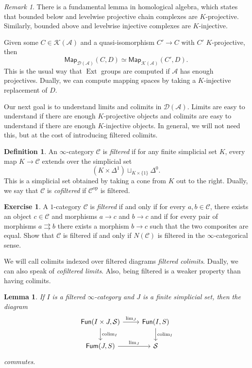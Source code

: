 \documentclass[10pt, oneside]{memoir}
\newtheorem{lem}[thm]{Lemma}
\theoremstyle{definition}
\newtheorem{defn}[thm]{Definition}
\newtheorem{exer}[thm]{Exercise}
\theoremstyle{remark}
\newtheorem{rmk}[thm]{Remark}
\theoremstyle{plain}
\theoremstyle{definition}
\theoremstyle{remark}
\newcommand{\mc}[1]{\mathcal{#1}}
\newcommand{\ms}[1]{\mathsf{#1}}
\newcommand{\1}{\mathbf{1}}
\newcommand{\2}{\mathbf{2}}
\newcommand{\3}{\mathbf{3}}
\DeclareMathOperator{\Ext}{Ext}
\DeclareMathOperator{\op}{op}
\DeclareMathOperator*{\colim}{colim}
\begin{document}
\begin{rmk}
    There is a fundamental lemma in homological algebra, which states that bounded below and levelwise projective chain complexes are \(K \)-projective. Similarly, bounded above and levelwise injective complexes are \(K \)-injective.
\end{rmk}

Given some \(C \in \mc{K}(\mc{A}) \) and a quasi-isomorphism \(C' \to C \) with \(C' \) \(K \)-projective, then
\[ \ms{Map}_{\mc{D}(\mc{A})} (C, D) \simeq \ms{Map}_{\mc{K}(\mc{A})} (C', D). \]
This is the usual way that \(\Ext \) groups are computed if \(\mc{A} \) has enough projectives. Dually, we can compute mapping spaces by taking a \(K \)-injective replacement of \(D \).

Our next goal is to understand limits and colimits in \(\mc{D}(\mc{A}) \). Limits are easy to understand if there are enough \(K \)-projective objects and colimits are easy to understand if there are enough \(K \)-injective objects. In general, we will not need this, but at the cost of introducing filtered colimits.

\begin{defn}
    An \(\infty \)-category \(\mc{C} \) is \textit{filtered} if for any finite simplicial set \(K \), every map \(K \to \mc{C} \) extends over the simplicial set
    \[ (K \times \Delta^1) \sqcup_{K \times \{1\}} \Delta^0. \]
    This is a simplicial set obtained by taking a cone from \(K \) out to the right. Dually, we say that \(\mc{C} \) is \textit{cofiltered} if \(\mc{C}^{\op} \) is filtered.
\end{defn}

\begin{exer}
    A \(1 \)-category \(\mc{C} \) is \textit{filtered} if and only if for every \(a, b \in \mc{C} \), there exists an object \(c \in \mc{C} \) and morphisms \(a \to c \) and \(b\to c \) and if for every pair of morphisms \(a \rightrightarrows b \) there exists a morphism \(b \to c \) such that the two composites are equal. Show that \(\mc{C} \) is filtered if and only if \(N(\mc{C}) \) is filtered in the \(\infty \)-categorical sense.
\end{exer}

We will call colimits indexed over filtered diagrams \textit{filtered colimits}. Dually, we can also speak of \textit{cofiltered limits}. Also, being filtered is a weaker property than having colimits.

\begin{lem}
    If \(I \) is a filtered \(\infty \)-category and \(J \) is a finite simplicial set, then the diagram
    \begin{equation*}
    \begin{tikzcd}
        \ms{Fun}(I \times J, \mc{S}) \ar{d}{\colim_I} \ar{r}{\lim_J} & \ms{Fun}(I, S) \ar{d}{\colim_I} \\
        \ms{Fum}(J, S) \ar{r}{\lim_J} & \mc{S}
    \end{tikzcd}
    \end{equation*}
    commutes.
\end{lem}
\end{document}
